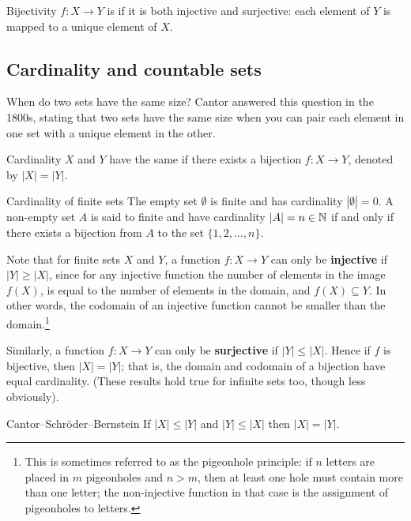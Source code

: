 \begin{defn}{Bijectivity}{}
$f:X\to Y$ is  if it is both injective and surjective: each element of $Y$ is mapped to a unique element of $X$.
\end{defn}
\pagebreak

\subsection{Cardinality and countable sets}
When do two sets have the same size? Cantor answered this question in the 1800s, stating that two sets have the same size when you can pair each element in one set with a unique element in the other.

\begin{defn}{Cardinality}{}
$X$ and $Y$ have the same  if there exists a bijection $f:X\to Y$, denoted by $|X| = |Y|$.
\end{defn}

\begin{defn}{Cardinality of finite sets}{}
The empty set $\emptyset$ is finite and has cardinality $|\emptyset| = 0$. A non-empty set $A$ is said to finite and have cardinality $|A| = n \in \mathbb N$ if and only if there exists a bijection from $A$ to the set $\{1,2,\dots,n\}$.
\end{defn}

\begin{remark}
Note that for finite sets $X$ and $Y$, a function $f:X \to Y$ can only be \textbf{injective} if $|Y| \ge |X|$, since for any injective function the number of elements in the image $f(X)$, is equal to the number of elements in the domain, and $f(X) \subseteq Y$. In other words, the codomain of an injective function cannot be smaller than the domain.\footnote{This is sometimes referred to as the pigeonhole principle: if $n$ letters are placed in $m$ pigeonholes and $n > m$, then at least one hole must contain more than one letter; the non-injective function in that case is the assignment of pigeonholes to letters.}

Similarly, a function $f:X \to Y$ can only be \textbf{surjective} if $|Y| \le |X|$. Hence if $f$ is bijective, then $|X|=|Y|$; that is, the domain and codomain of a bijection have equal cardinality. (These results hold true for infinite sets too, though less obviously).
\end{remark}

\begin{thrm}{Cantor--Schr\"{o}der--Bernstein}{}
If $|X| \le |Y|$ and $|Y| \le |X|$ then $|X| = |Y|$.
\end{thrm}

